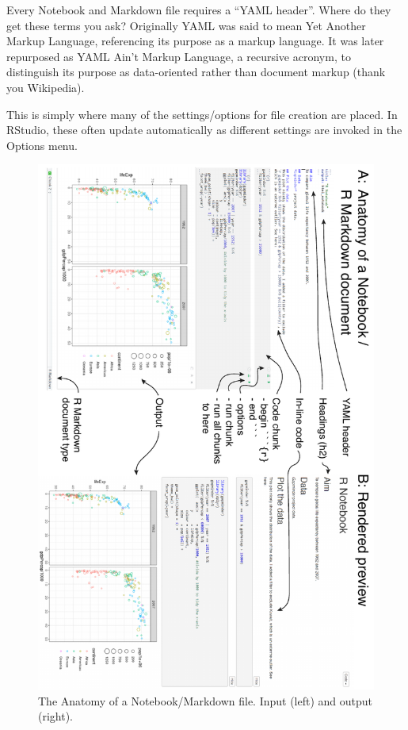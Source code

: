 \documentclass[
  12pt,
  krantz2]{krantz}
\begin{document}

Every Notebook and Markdown file requires a ``YAML header''.
Where do they get these terms you ask?
Originally YAML was said to mean Yet Another Markup Language, referencing its purpose as a markup language.
It was later repurposed as YAML Ain't Markup Language, a recursive acronym, to distinguish its purpose as data-oriented rather than document markup (thank you Wikipedia).

This is simply where many of the settings/options for file creation are placed.
In RStudio, these often update automatically as different settings are invoked in the Options menu.

\begin{figure}
\centering
\includegraphics{images/chapter12/2_anatomy_rotated.pdf}
\caption{\label{fig:chap12-fig-anatomy}The Anatomy of a Notebook/Markdown file. Input (left) and output (right).}
\end{figure}
\end{document}

